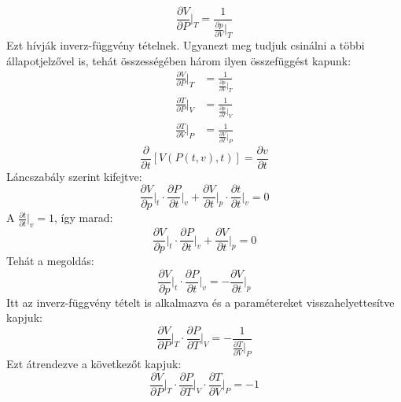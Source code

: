 \documentclass[a4paper,12pt]{article}
\begin{document}
\begin{equation}
    \frac{\partial V}{\partial P}\bigg|_{T} = \frac{1}{\frac{\partial p}{\partial V}\big|_{T}}
\end{equation}
Ezt hívják inverz-függvény tételnek. Ugyanezt meg tudjuk csinálni a többi állapotjelzővel is, tehát összességében három ilyen összefüggést kapunk:
\begin{equation}
    \begin{aligned}
        \frac{\partial V}{\partial P}\bigg|_{T} &= \frac{1}{\frac{\partial p}{\partial V}\big|_{T}} \\
        \frac{\partial T}{\partial P}\bigg|_{V} &= \frac{1}{\frac{\partial p}{\partial T}\big|_{V}} \\
        \frac{\partial T}{\partial V}\bigg|_{P} &= \frac{1}{\frac{\partial V}{\partial T}\big|_{P}} 
    \end{aligned}
\end{equation}
\begin{equation}
    \frac{\partial}{\partial t} \left[V(P(t, v), t)\right] = \frac{\partial v}{\partial t}
\end{equation}
Láncszabály szerint kifejtve:
\begin{equation}
    \frac{\partial V}{\partial p}\bigg|_{t} \cdot \frac{\partial P}{\partial t}\bigg|_{v} + \frac{\partial V}{\partial t}\bigg|_{p} \cdot \frac{\partial t}{\partial t}\bigg|_{v} = 0
\end{equation}
A $\frac{\partial t}{\partial t}\big|_{v} = 1$, így marad:
\begin{equation}
    \frac{\partial V}{\partial p}\bigg|_{t} \cdot \frac{\partial P}{\partial t}\bigg|_{v} + \frac{\partial V}{\partial t}\bigg|_{p} = 0
\end{equation}
Tehát a megoldás:
\begin{equation}
     \frac{\partial V}{\partial p}\bigg|_{t} \cdot \frac{\partial P}{\partial t}\bigg|_{v} = - \frac{\partial V}{\partial t}\bigg|_{p}
\end{equation}
Itt az inverz-függvény tételt is alkalmazva és a paramétereket visszahelyettesítve kapjuk:
\begin{equation}
     \frac{\partial V}{\partial P}\bigg|_{T} \cdot \frac{\partial P}{\partial T}\bigg|_{V} = - \frac{1}{\frac{\partial T}{\partial V}\big|_{P}}
\end{equation}
Ezt átrendezve a következőt kapjuk:
\begin{equation}
     \frac{\partial V}{\partial P}\bigg|_{T} \cdot \frac{\partial P}{\partial T}\bigg|_{V} \cdot \frac{\partial T}{\partial V}\bigg|_{P} = -1
\end{equation}
\end{document}
